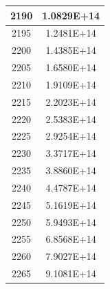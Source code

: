 \documentclass[a4paper]{article}
\begin{document}
\begin{tabular}{| c | c |}
    	2190 & 1.0829E+14 \\\hline
    	2195 & 1.2481E+14 \\\hline
    	2200 & 1.4385E+14 \\\hline
    	2205 & 1.6580E+14 \\\hline
    	2210 & 1.9109E+14 \\\hline
    	2215 & 2.2023E+14 \\\hline
    	2220 & 2.5383E+14 \\\hline
    	2225 & 2.9254E+14 \\\hline
    	2230 & 3.3717E+14 \\\hline
    	2235 & 3.8860E+14 \\\hline
    	2240 & 4.4787E+14 \\\hline
    	2245 & 5.1619E+14 \\\hline
    	2250 & 5.9493E+14 \\\hline
    	2255 & 6.8568E+14 \\\hline
    	2260 & 7.9027E+14 \\\hline
    	2265 & 9.1081E+14 \\\hline
    \end{tabular}
    \hfill
\end{document}
